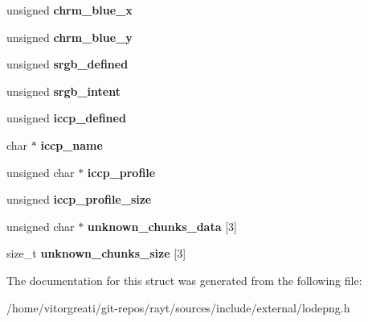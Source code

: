 \begin{DoxyCompactItemize}
\mbox{\label{struct_lode_p_n_g_info_a7394fc7407c168180b2cf64896fbe7fc}} 
unsigned {\bfseries chrm\+\_\+blue\+\_\+x}
\item 
\mbox{\label{struct_lode_p_n_g_info_a9e6af4de8972b039ecb137fb32167505}} 
unsigned {\bfseries chrm\+\_\+blue\+\_\+y}
\item 
\mbox{\label{struct_lode_p_n_g_info_a3a0795a8ec1ddcaac245ba3337054e46}} 
unsigned {\bfseries srgb\+\_\+defined}
\item 
\mbox{\label{struct_lode_p_n_g_info_a35a37c55a3b6c5ff3d064dd26531c72b}} 
unsigned {\bfseries srgb\+\_\+intent}
\item 
\mbox{\label{struct_lode_p_n_g_info_a6304883960715cbcebf45a05c40d5b53}} 
unsigned {\bfseries iccp\+\_\+defined}
\item 
\mbox{\label{struct_lode_p_n_g_info_a0e139ec8c88c920bedb602090a3546d0}} 
char $\ast$ {\bfseries iccp\+\_\+name}
\item 
\mbox{\label{struct_lode_p_n_g_info_a4400b67420e9c225881901bb48eda9b2}} 
unsigned char $\ast$ {\bfseries iccp\+\_\+profile}
\item 
\mbox{\label{struct_lode_p_n_g_info_a11eaae6ecbb308ac1e70dcd10fee6891}} 
unsigned {\bfseries iccp\+\_\+profile\+\_\+size}
\item 
\mbox{\label{struct_lode_p_n_g_info_a8347476da7fc2fc6af4ec7ed44b638c6}} 
unsigned char $\ast$ {\bfseries unknown\+\_\+chunks\+\_\+data} \mbox{[}3\mbox{]}
\item 
\mbox{\label{struct_lode_p_n_g_info_a25a81d760759bd0383ae5a81ba83911d}} 
size\+\_\+t {\bfseries unknown\+\_\+chunks\+\_\+size} \mbox{[}3\mbox{]}
\end{DoxyCompactItemize}


The documentation for this struct was generated from the following file\+:\begin{DoxyCompactItemize}
\item 
/home/vitorgreati/git-\/repos/rayt/sources/include/external/lodepng.\+h\end{DoxyCompactItemize}

